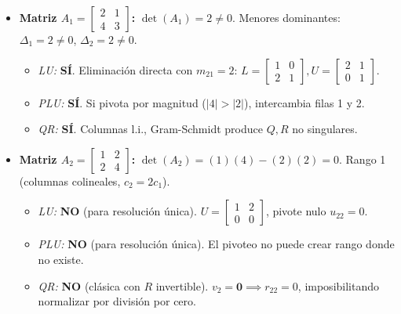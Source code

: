 \documentclass[11pt,a4paper]{article}
\theoremstyle{definition}
\theoremstyle{remark}
\begin{document}
\begin{itemize}[leftmargin=*]
    \item \textbf{Matriz $A_1 = \begin{bmatrix} 2 & 1 \\ 4 & 3 \end{bmatrix}$:}
    $\det(A_1) = 2 \neq 0$. Menores dominantes: $\Delta_1 = 2 \neq 0$, $\Delta_2 = 2 \neq 0$.
    \begin{itemize}
        \item \textit{LU:} \textbf{SÍ}. Eliminación directa con $m_{21} = 2$: $L = \begin{bmatrix} 1 & 0 \\ 2 & 1 \end{bmatrix}, U = \begin{bmatrix} 2 & 1 \\ 0 & 1 \end{bmatrix}$.
        \item \textit{PLU:} \textbf{SÍ}. Si pivota por magnitud ($|4| > |2|$), intercambia filas 1 y 2.
        \item \textit{QR:} \textbf{SÍ}. Columnas l.i., Gram-Schmidt produce $Q, R$ no singulares.
    \end{itemize}

    \item \textbf{Matriz $A_2 = \begin{bmatrix} 1 & 2 \\ 2 & 4 \end{bmatrix}$:}
    $\det(A_2) = (1)(4) - (2)(2) = 0$. Rango 1 (columnas colineales, $c_2 = 2c_1$).
    \begin{itemize}
        \item \textit{LU:} \textbf{NO} (para resolución única). $U = \begin{bmatrix} 1 & 2 \\ 0 & 0 \end{bmatrix}$, pivote nulo $u_{22} = 0$.
        \item \textit{PLU:} \textbf{NO} (para resolución única). El pivoteo no puede crear rango donde no existe.
        \item \textit{QR:} \textbf{NO} (clásica con $R$ invertible). $v_2 = \mathbf{0} \implies r_{22} = 0$, imposibilitando normalizar por división por cero.
    \end{itemize}


\end{itemize}
\end{document}
